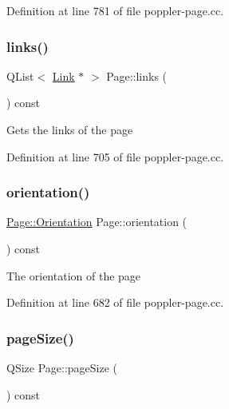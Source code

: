 Definition at line 781 of file poppler-\/page.\+cc.

\mbox{\label{class_poppler_1_1_page_ac67e76e3cb301bba5c25e127cc47e0b8}} 
\subsubsection{\texorpdfstring{links()}{links()}}
{\footnotesize\ttfamily Q\+List$<$ \hyperlink{class_poppler_1_1_link}{Link} $\ast$ $>$ Page\+::links (\begin{DoxyParamCaption}{ }\end{DoxyParamCaption}) const}

Gets the links of the page 

Definition at line 705 of file poppler-\/page.\+cc.

\mbox{\label{class_poppler_1_1_page_a168a4a6c452eb365a4cd7170d6a98e29}} 
\subsubsection{\texorpdfstring{orientation()}{orientation()}}
{\footnotesize\ttfamily \hyperlink{class_poppler_1_1_page_a1075c38ddba641b4dc23ee4860302cc2}{Page\+::\+Orientation} Page\+::orientation (\begin{DoxyParamCaption}{ }\end{DoxyParamCaption}) const}

The orientation of the page 

Definition at line 682 of file poppler-\/page.\+cc.

\mbox{\label{class_poppler_1_1_page_ab8ec6ce478c903505f6b041200ba5f4a}} 
\subsubsection{\texorpdfstring{page\+Size()}{pageSize()}}
{\footnotesize\ttfamily Q\+Size Page\+::page\+Size (\begin{DoxyParamCaption}{ }\end{DoxyParamCaption}) const}

